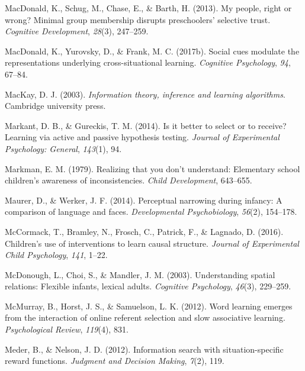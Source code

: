 \documentclass[oneside]{report}
\begin{document}
\leavevmode\hypertarget{ref-macdonald2013my}{}%
MacDonald, K., Schug, M., Chase, E., \& Barth, H. (2013). My people,
right or wrong? Minimal group membership disrupts preschoolers'
selective trust. \emph{Cognitive Development}, \emph{28}(3), 247--259.

\leavevmode\hypertarget{ref-macdonald2017social}{}%
MacDonald, K., Yurovsky, D., \& Frank, M. C. (2017b). Social cues
modulate the representations underlying cross-situational learning.
\emph{Cognitive Psychology}, \emph{94}, 67--84.

\leavevmode\hypertarget{ref-mackay2003information}{}%
MacKay, D. J. (2003). \emph{Information theory, inference and learning
algorithms}. Cambridge university press.

\leavevmode\hypertarget{ref-markant2014better}{}%
Markant, D. B., \& Gureckis, T. M. (2014). Is it better to select or to
receive? Learning via active and passive hypothesis testing.
\emph{Journal of Experimental Psychology: General}, \emph{143}(1), 94.

\leavevmode\hypertarget{ref-markman1979realizing}{}%
Markman, E. M. (1979). Realizing that you don't understand: Elementary
school children's awareness of inconsistencies. \emph{Child
Development}, 643--655.

\leavevmode\hypertarget{ref-maurer2014perceptual}{}%
Maurer, D., \& Werker, J. F. (2014). Perceptual narrowing during
infancy: A comparison of language and faces. \emph{Developmental
Psychobiology}, \emph{56}(2), 154--178.

\leavevmode\hypertarget{ref-mccormack2016children}{}%
McCormack, T., Bramley, N., Frosch, C., Patrick, F., \& Lagnado, D.
(2016). Children's use of interventions to learn causal structure.
\emph{Journal of Experimental Child Psychology}, \emph{141}, 1--22.

\leavevmode\hypertarget{ref-mcdonough2003understanding}{}%
McDonough, L., Choi, S., \& Mandler, J. M. (2003). Understanding spatial
relations: Flexible infants, lexical adults. \emph{Cognitive
Psychology}, \emph{46}(3), 229--259.

\leavevmode\hypertarget{ref-mcmurray2012word}{}%
McMurray, B., Horst, J. S., \& Samuelson, L. K. (2012). Word learning
emerges from the interaction of online referent selection and slow
associative learning. \emph{Psychological Review}, \emph{119}(4), 831.

\leavevmode\hypertarget{ref-meder2012information}{}%
Meder, B., \& Nelson, J. D. (2012). Information search with
situation-specific reward functions. \emph{Judgment and Decision
Making}, \emph{7}(2), 119.
\end{document}
